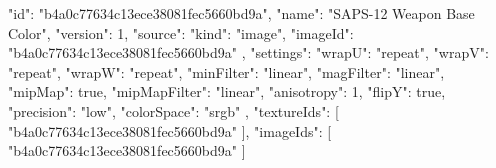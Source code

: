 {
  "id": "b4a0c77634c13ece38081fec5660bd9a",
  "name": "SAPS-12 Weapon Base Color",
  "version": 1,
  "source": {
    "kind": "image",
    "imageId": "b4a0c77634c13ece38081fec5660bd9a"
  },
  "settings": {
    "wrapU": "repeat",
    "wrapV": "repeat",
    "wrapW": "repeat",
    "minFilter": "linear",
    "magFilter": "linear",
    "mipMap": true,
    "mipMapFilter": "linear",
    "anisotropy": 1,
    "flipY": true,
    "precision": "low",
    "colorSpace": "srgb"
  },
  "textureIds": [
    "b4a0c77634c13ece38081fec5660bd9a"
  ],
  "imageIds": [
    "b4a0c77634c13ece38081fec5660bd9a"
  ]
}
